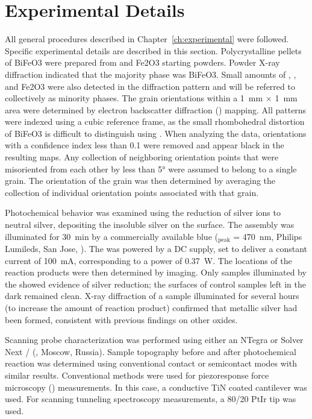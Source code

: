 \documentclass[12pt,%
              twoside,
               letterpaper]{uiothesis}
\begin{document}
\section{Experimental Details}
\label{sec:ch7experimental}


All general procedures described in Chapter~\ref{ch:experimental} were followed. Specific
experimental details are described in this section. Polycrystalline pellets of BiFeO3
were prepared from  and Fe2O3 starting powders. Powder X-ray diffraction
indicated that the majority phase was BiFeO3. Small amounts of ,
, and Fe2O3 were also detected in the diffraction pattern and will be
referred to collectively as minority phases. The grain orientations within a
\SI{1}{\milli\meter} $\times$ \SI{1}{\milli\meter} area were determined by electron
backscatter diffraction () mapping. All patterns were indexed using a cubic
reference frame, as the small rhombohedral distortion\cite{Luo:2006kg} of BiFeO3 is
difficult to distinguish using . When analyzing the  data,
orientations with a confidence index less than 0.1 were removed and appear black in the
resulting  maps. Any collection of neighboring orientation points that were
misoriented from each other by less than 5\si{\degree} were assumed to belong to a single
grain. The orientation of the grain was then determined by averaging the collection of
individual orientation points associated with that grain.

Photochemical behavior was examined using the reduction of silver ions to neutral silver,
depositing the insoluble silver on the surface.\cite{CLARK:1965ct,HERRMANN:1988do} The
assembly was illuminated for \SI{30}{\minute} by a commercially available blue 
(\textlambda$_\text{peak}$ = \SI{470}{\nano\meter}, Philips Lumileds, San Jose,
). The  was powered by a DC supply, set to deliver a constant current
of \SI{100}{\milli\ampere}, corresponding to a power of \SI{0.37}{\watt}. The locations of
the reaction products were then determined by  imaging. Only samples illuminated
by the  showed evidence of silver reduction; the surfaces of control samples
left in the dark remained clean. X-ray diffraction of a sample illuminated for several
hours (to increase the amount of reaction product) confirmed that metallic silver had been
formed, consistent with previous findings on other
oxides.\cite{Giocondi:2001gz,Lowekamp:1998ks}

Scanning probe characterization was performed using either an  NTegra or
Solver Next / (, Moscow, Russia). Sample topography
before and after photochemical reaction was determined using conventional contact or
semicontact modes with similar results. Conventional methods were used for piezoresponse
force microscopy () measurements.\cite{Christman:1998vu} In this case, a
conductive TiN coated cantilever was used. For scanning tunneling spectroscopy
measurements, a 80/20 PtIr tip was used.
\end{document}
